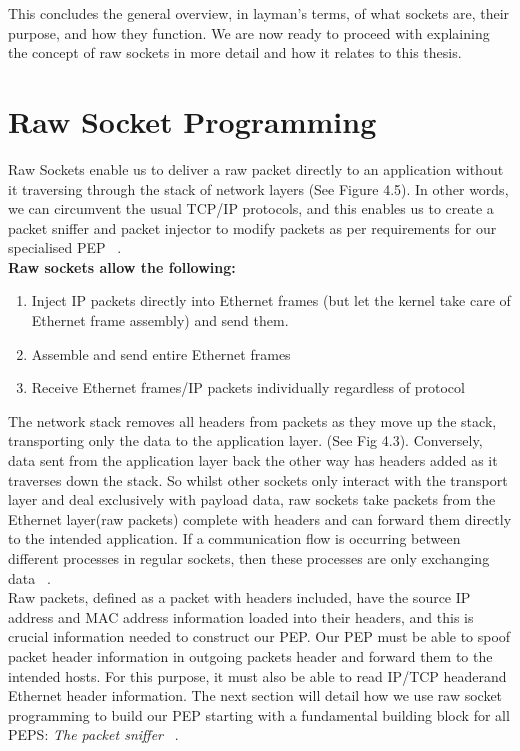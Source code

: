 This concludes the general overview, in layman's terms, of what sockets are, their purpose, and how they function.  We are now ready to proceed with explaining the concept of raw sockets in more detail and how it relates to this thesis.\\

\section{Raw Socket Programming}
Raw Sockets enable us to deliver a raw packet directly to an application without it traversing through the stack of network layers (See Figure 4.5).
In other words, we can circumvent the usual TCP/IP protocols, and this enables us to create a packet sniffer and packet injector to modify packets as per requirements for our specialised PEP ~\cite{38}. \\

\textbf{Raw sockets allow the following:}\\

\begin{enumerate}
\item Inject IP packets directly into Ethernet frames (but let the kernel take care of Ethernet frame assembly) and send them.
\item Assemble and send entire Ethernet frames
\item Receive Ethernet frames/IP packets individually regardless of protocol\\
\end{enumerate}

The network stack removes all headers from packets as they move up the stack, transporting only the data to the application layer. (See Fig 4.3). Conversely, data sent from the application layer back the other way has headers added as it traverses down the stack. So whilst other sockets only interact with the transport layer and deal exclusively with payload data, raw sockets take packets from the Ethernet layer(raw packets) complete with headers and can forward them directly to the intended application. If a communication flow is occurring between different processes in regular sockets, then these processes are only exchanging data ~\cite{38}.\\

Raw packets, defined as a packet with headers included, have the source IP address and MAC address information loaded into their headers, and this is crucial information needed to construct our PEP. Our PEP must be able to spoof packet header information in outgoing packets header and forward them to the intended hosts. For this purpose, it must also be able to read IP/TCP headerand Ethernet header information. The next section will detail how we use raw socket programming to build our PEP starting with a fundamental building block for all PEPS: \emph{The packet sniffer} ~\cite{38}.\\

